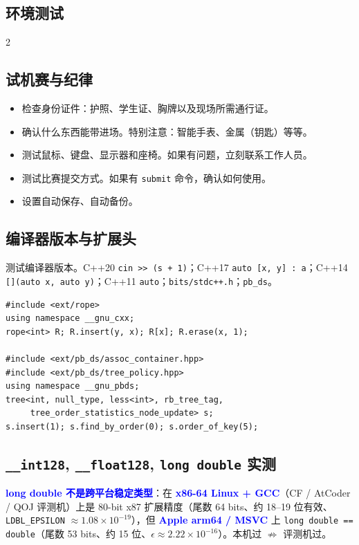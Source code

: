 	\begin{center}
		\section{环境测试}
	\end{center}

\begin{multicols*}{2}

	\subsection{试机赛与纪律}

	\begin{itemize}
		\item 检查身份证件：护照、学生证、胸牌以及现场所需通行证。
		\item 确认什么东西能带进场。特别注意：智能手表、金属（钥匙）等等。
		\item 测试鼠标、键盘、显示器和座椅。如果有问题，立刻联系工作人员。
		\item 测试比赛提交方式。如果有 \texttt{submit} 命令，确认如何使用。
		\item 设置自动保存、自动备份。
	\end{itemize}

	\subsection{编译器版本与扩展头}

	测试编译器版本。C++20 \verb|cin >> (s + 1)|；C++17 \verb|auto [x, y] : a|；C++14 \verb|[](auto x, auto y)|；C++11 \verb|auto|；\texttt{bits/stdc++.h}；\texttt{pb\_ds}。

	\begin{verbatim}
#include <ext/rope>
using namespace __gnu_cxx;
rope<int> R; R.insert(y, x); R[x]; R.erase(x, 1);

#include <ext/pb_ds/assoc_container.hpp>
#include <ext/pb_ds/tree_policy.hpp>
using namespace __gnu_pbds;
tree<int, null_type, less<int>, rb_tree_tag,
     tree_order_statistics_node_update> s;
s.insert(1); s.find_by_order(0); s.order_of_key(5);
	\end{verbatim}

	\subsection{\texttt{\_\_int128}, \texttt{\_\_float128}, \texttt{long double} 实测}

	\textcolor{blue}{\textbf{long double 不是跨平台稳定类型}}：在 \textcolor{blue}{\textbf{x86-64 Linux + GCC}}（CF / AtCoder / QOJ 评测机）上是 80-bit x87 扩展精度（尾数 64 bits、约 18--19 位有效、\texttt{LDBL\_EPSILON} $\approx 1.08 \times 10^{-19}$），但 \textcolor{blue}{\textbf{Apple arm64 / MSVC}} 上 \texttt{long double == double}（尾数 53 bits、约 15 位、$\epsilon \approx 2.22 \times 10^{-16}$）。本机过 $\not\Rightarrow$ 评测机过。


\end{multicols*}
